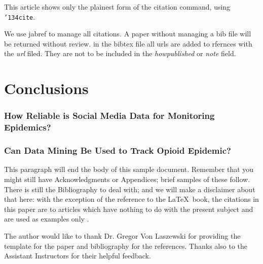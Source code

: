 \documentclass[sigconf]{acmart}
\begin{document}
This article shows only the plainest form of the citation command,
using \texttt{{\char'134}cite}.

We use jabref to manage all citations. A paper without managing a bib
file will be returned without review. in the bibtex file all urls are
added to rfernces with the {\it url} filed. They are not to be
included in the {\it howpublished} or {\it note} field. 



\section{Conclusions}

\subsubsection{How Reliable is Social Media Data for Monitoring Epidemics?}


\subsubsection{Can Data Mining Be Used to Track Opioid Epidemic?}


This paragraph will end the body of this sample document.  Remember
that you might still have Acknowledgments or Appendices; brief samples
of these follow.  There is still the Bibliography to deal with; and we
will make a disclaimer about that here: with the exception of the
reference to the \LaTeX\ book, the citations in this paper are to
articles which have nothing to do with the present subject and are
used as examples only \cite{Paul2014}.


\begin{acks}

  The author would like to thank Dr. Gregor Von Laszewski for providing the 
  \LaTex template for the paper and \JabRef bibliography for the references. 
  Thanks also to the Assistant Instructors for their helpful feedback.

\end{acks}


 
\end{document}

